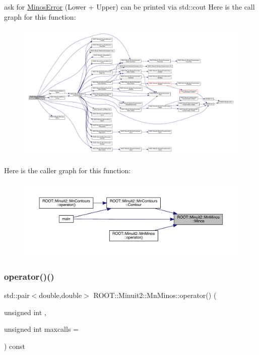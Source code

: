 ask for \mbox{\hyperlink{classROOT_1_1Minuit2_1_1MinosError}{Minos\+Error}} (Lower + Upper) can be printed via std\+::cout Here is the call graph for this function\+:
\nopagebreak
\begin{figure}[H]
\begin{center}
\leavevmode
\includegraphics[width=350pt]{dc/d91/classROOT_1_1Minuit2_1_1MnMinos_aeb1fe39f5851b5af050191d812d21723_cgraph}
\end{center}
\end{figure}
Here is the caller graph for this function\+:
\nopagebreak
\begin{figure}[H]
\begin{center}
\leavevmode
\includegraphics[width=350pt]{dc/d91/classROOT_1_1Minuit2_1_1MnMinos_aeb1fe39f5851b5af050191d812d21723_icgraph}
\end{center}
\end{figure}
\mbox{\label{classROOT_1_1Minuit2_1_1MnMinos_a82c85ed2e8212675339ffcc2a5bb61cb}} 
\subsubsection{\texorpdfstring{operator()()}{operator()()}\hspace{0.1cm}{\footnotesize\ttfamily [1/3]}}
{\footnotesize\ttfamily std\+::pair$<$double,double$>$ R\+O\+O\+T\+::\+Minuit2\+::\+Mn\+Minos\+::operator() (\begin{DoxyParamCaption}\item[{unsigned int}]{,  }\item[{unsigned int}]{maxcalls = {} }\end{DoxyParamCaption}) const}

